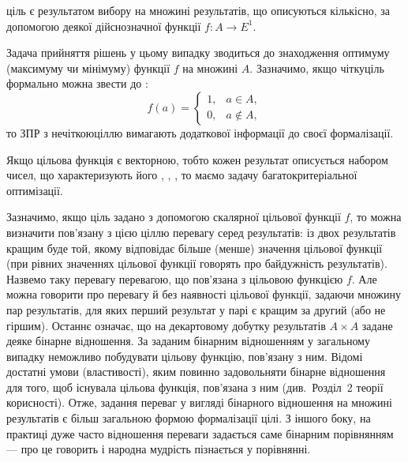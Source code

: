 \documentclass[a4paper, 12pt]{article}
\begin{document}
\begin{definition}
	\textit{\guillemotright} ціль є результатом вибору на множині результатів, що описуються кількісно, за допомогою деякої дійснозначної функції $f: A \to E^1$.
\end{definition}

Задача прийняття рішень у цьому випадку зводиться до знаходження оптимуму (максимуму чи мінімуму) функції $f$ на множині $A$. Зазначимо, якщо  чітку\guillemotright ціль формально можна звести до \guillemotright:
\[
f(a) = \begin{cases}
	1, & a \in A, \\
	0, & a \notin A,
\end{cases}
\]
то ЗПР з  нечіткою\guillemotright ціллю вимагають додаткової інформації до своєї формалізації. \medskip

Якщо цільова функція є векторною, тобто кожен результат описується набором чисел, що характеризують його \guillemotright, \guillemotright, \guillemotright, то маємо задачу багатокритеріальної оптимізації. \medskip

Зазначимо, якщо ціль задано з допомогою скалярної цільової функції $f$, то можна визначити пов'язану з цією ціллю перевагу серед результатів: із двох результатів кращим буде той, якому відповідає більше (менше) значення цільової функції (при рівних значеннях цільової функції говорять про байдужність результатів). Назвемо таку перевагу перевагою, що пов'язана з цільовою функцією $f$. Але можна говорити про перевагу й без наявності цільової функції, задаючи множину пар результатів, для яких перший результат у парі є кращим за другий (або не гіршим). Останнє означає, що на декартовому добутку результатів $A \times A$ задане деяке бінарне відношення. За заданим бінарним відношенням у загальному випадку неможливо побудувати цільову функцію, пов'язану з ним. Відомі достатні умови (властивості), яким повинно задовольняти бінарне відношення для того, щоб існувала цільова функція, пов'язана з ним (див.~Розділ~2  теорії корисності\guillemotright). Отже, задання переваг у вигляді бінарного відношення на множині результатів є більш загальною формою формалізації цілі. З іншого боку, на практиці дуже часто відношення переваги задається саме бінарним порівнянням --- про це говорить і народна мудрість  пізнається у порівнянні\guillemotright.
\end{document}
